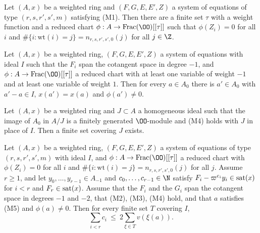 \begin{lemma}\label{pf:vwin-he:cut}
Let $(A,x)$ be a weighted ring and $(F,G,E,E',Z)$ a system of equations of type $(r,s,r',s',m)$ satisfying
\textup{(M1)}. Then there are a finite set $\tau$ with a weight function and a reduced chart
$\phi:A\to\mathrm{Frac}(\OO)[[\tau]]$ such that $\phi(Z_i)=0$ for all $i$ and
$\#\{i:\mathrm{wt}(i)=j\}=n_{r,s,r',s',0}(j)$ for all $j\in\Z$.
\end{lemma}

\begin{lemma}\label{pf:vwin-he:nz}
Let $(A,x)$ be a weighted ring, $(F,G,E,E',Z)$ a system of equations with ideal $I$ such that the $F_i$ span the
cotangent space in degree $-1$, and $\phi:A\to\mathrm{Frac}(\OO)[[\tau]]$ a reduced chart with at least one variable
of weight $-1$ and at least one variable of weight $1$. Then for every $a\in A_0$ there is $a'\in A_0$ with
$a'-a\in I$, $x(a')=x(a)$ and $\phi(a')\ne0$.
\end{lemma}

\begin{lemma}\label{pf:vwin-he:fin}
Let $(A,x)$ be a weighted ring and $J\subset A$ a homogeneous ideal such that the image of $A_0$ in $A/J$ is a
finitely generated $\OO$-module and \textup{(M4)} holds with $J$ in place of $I$. Then a finite set covering $J$
exists.
\end{lemma}

\begin{theorem}\label{pf:vwin-he:core}
Let $(A,x)$ be a weighted ring, $(F,G,E,E',Z)$ a system of equations of type $(r,s,r',s',m)$ with ideal $I$, and
$\phi:A\to\mathrm{Frac}(\OO)[[\tau]]$ a reduced chart with $\phi(Z_i)=0$ for all $i$ and
$\#\{i:\mathrm{wt}(i)=j\}=n_{r,s,r',s',0}(j)$ for all $j$. Assume $r\ge1$, and let $y_0,\dots,y_{r-1}\in A_{-1}$ and
$c_0,\dots,c_{r-1}\in\N$ satisfy $F_i-\varpi^{c_i}y_i\in\operatorname{sat}(x)$ for $i<r$ and $F_r\in\operatorname{sat}(x)$. Assume
that the $F_i$ and the $G_i$ span the cotangent space in degrees $-1$ and $-2$, that \textup{(M2)}, \textup{(M3)},
\textup{(M4)} hold, and that $a$ satisfies \textup{(M5)} and $\phi(a)\ne0$. Then for every finite set $T$ covering $I$,
\[
 \sum_{i<r}c_i\ \le\ 2\sum_{\xi\in T}v(\xi(a)).
\]
\end{theorem}

